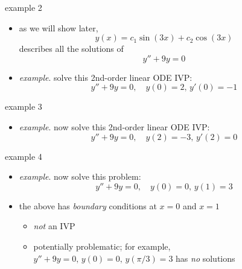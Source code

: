 \documentclass{beamer}
\begin{document}
\begin{frame}{example 2}

\begin{itemize}
\item as we will show later,
    $$y(x) = c_1 \sin(3x) + c_2 \cos(3x)$$
describes all the solutions of
    $$y'' + 9 y = 0$$
\item \emph{example}.  solve this 2nd-order linear ODE IVP:
    $$y'' + 9y = 0, \quad y(0)=2, \, y'(0)=-1$$
\end{itemize}

\vspace{25mm}
\end{frame}


\begin{frame}{example 3}

\begin{itemize}
\item \emph{example}.  now solve this 2nd-order linear ODE IVP:
    $$y'' + 9y = 0, \quad y(2)=-3, \, y'(2)=0$$
\end{itemize}

\vspace{40mm}
\end{frame}


\begin{frame}{example 4}

\begin{itemize}
\item \emph{example}.  now solve this problem:
    $$y'' + 9y = 0, \quad y(0)=0, \, y(1)=3$$

\vspace{40mm}
\item the above has \emph{boundary} conditions at $x=0$ and $x=1$
    \begin{itemize}
    \item \emph{not} an IVP
    \item potentially problematic; for example, $y'' + 9y = 0, \, y(0)=0, \, y(\pi/3)=3$ has \emph{no} solutions
    \end{itemize}
\end{itemize}
\end{frame}
\end{document}
